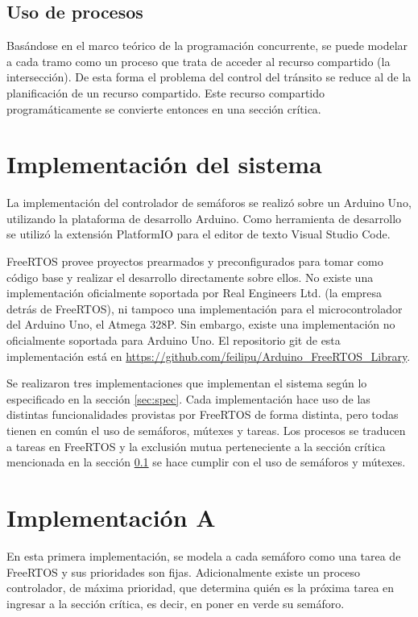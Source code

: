 \subsection{Uso de procesos}\label{sec:proc}

	Basándose en el marco teórico de la programación concurrente, se puede modelar a cada tramo como un proceso que trata de acceder al recurso compartido (la intersección).
	De esta forma el problema del control del tránsito se reduce al de la planificación de un recurso compartido.
	Este recurso compartido programáticamente se convierte entonces en una sección crítica.



\section{Implementación del sistema}

La implementación del controlador de semáforos se realizó sobre un Arduino Uno, utilizando la plataforma de desarrollo Arduino.
Como herramienta de desarrollo se utilizó la extensión PlatformIO para el editor de texto Visual Studio Code.

FreeRTOS provee proyectos prearmados y preconfigurados para tomar como código base y realizar el desarrollo directamente sobre ellos.
No existe una implementación oficialmente soportada por Real Engineers Ltd. (la empresa detrás de FreeRTOS), ni tampoco una implementación para el microcontrolador del Arduino Uno, el Atmega 328P.
Sin embargo, existe una implementación no oficialmente soportada para Arduino Uno.
El repositorio git de esta implementación está en \url{https://github.com/feilipu/Arduino\_FreeRTOS\_Library}.

Se realizaron tres implementaciones que implementan el sistema según lo especificado en la sección \ref{sec:spec}.
Cada implementación hace uso de las distintas funcionalidades provistas por FreeRTOS de forma distinta, pero todas tienen en común el uso de semáforos, mútexes y tareas.
Los procesos se traducen a tareas en FreeRTOS y la exclusión mutua perteneciente a la sección crítica mencionada en la sección \ref{sec:proc} se hace cumplir con el uso de semáforos y mútexes.



\section{Implementación A}

En esta primera implementación, se modela a cada semáforo como una tarea de FreeRTOS y sus prioridades son fijas.
Adicionalmente existe un proceso controlador, de máxima prioridad, que determina quién es la próxima tarea en ingresar a la sección crítica, es decir, en poner en verde su semáforo.

